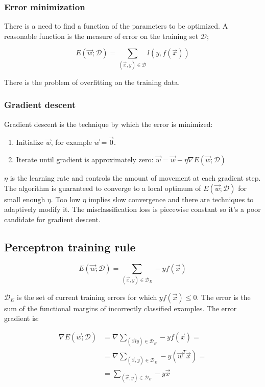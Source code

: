 		\subsubsection{Error minimization}
		There is a need to find a function of the parameters to be optimized.
		A reasonable function is the measure of error on the training set $\mathcal{D}$;

		$$E(\vec{w};\mathcal{D}) = \sum\limits_{(\vec{x}, y)\in\mathcal{D}}l(y, f(\vec{x}))$$

		There is the problem of overfitting on the training data.

		\subsubsection{Gradient descent}
		Gradient descent is the technique by which the error is minimized:

		\begin{enumerate}
			\item Initialize $\vec{w}$, for example $\vec{w} = \vec{0}$.
			\item Iterate until gradient is approximately zero: $\vec{w} = \vec{w}-\eta\nabla E(\vec{w};\mathcal{D})$
		\end{enumerate}

		$\eta$ is the learning rate and controls the amount of movement at each gradient step.
		The algorithm is guaranteed to converge to a local optimum of $E(\vec{w};\mathcal{D})$ for small enough $\eta$.
		Too low $\eta$ implies slow convergence and there are techniques to adaptively modify it.
		The misclassification loss is piecewise constant so it's a poor candidate for gradient descent.

	\subsection{Perceptron training rule}

	$$E(\vec{w};\mathcal{D}) = \sum\limits_{(\vec{x}, y)\in\mathcal{D}_E}-yf(\vec{x})$$

	$\mathcal{D}_E$ is the set of current training errors for which $yf(\vec{x}) \le 0$.
	The error is the sum of the functional margins of incorrectly classified examples.
	The error gradient is:

	\begin{align*}
		\nabla E(\vec{w};\mathcal{D}) &= \nabla\sum\limits_{(\vec{x}ly)\in\mathcal{D}_E}-yf(\vec{x})=\\
																	&=\nabla\sum\limits_{(\vec{x},y)\in\mathcal{D}_E}-y(\vec{w}^T\vec{x})=\\
																	&=\sum\limits_{(\vec{x},y)\in\mathcal{D}_E}-y\vec{x}
	\end{align*}

